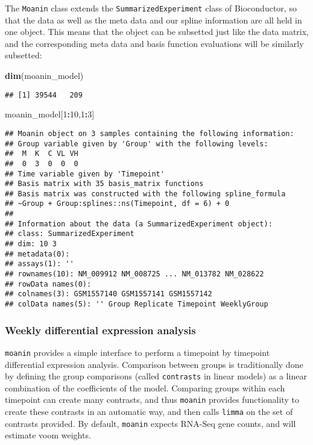 \documentclass[9pt,a4paper,]{extarticle}
\newenvironment{Shaded}{\begin{snugshade}}{\end{snugshade}}
\newcommand{\DecValTok}[1]{\textcolor[rgb]{0.00,0.00,0.81}{#1}}
\newcommand{\KeywordTok}[1]{\textcolor[rgb]{0.13,0.29,0.53}{\textbf{#1}}}
\newcommand{\NormalTok}[1]{#1}
\newcommand{\OperatorTok}[1]{\textcolor[rgb]{0.81,0.36,0.00}{\textbf{#1}}}
\begin{document}
The \texttt{Moanin} class extends the \texttt{SummarizedExperiment} class of Bioconductor, so that the data as well as the meta data and our spline information are all held in one object. This means that the object can be subsetted just like the data matrix, and the corresponding meta data and basis function evaluations will be similarly subsetted:

\begin{Shaded}
\begin{Highlighting}[]
\KeywordTok{dim}\NormalTok{(moanin_model)}
\end{Highlighting}
\end{Shaded}

\begin{verbatim}
## [1] 39544   209
\end{verbatim}

\begin{Shaded}
\begin{Highlighting}[]
\NormalTok{moanin_model[}\DecValTok{1}\OperatorTok{:}\DecValTok{10}\NormalTok{,}\DecValTok{1}\OperatorTok{:}\DecValTok{3}\NormalTok{]}
\end{Highlighting}
\end{Shaded}

\begin{verbatim}
## Moanin object on 3 samples containing the following information:
## Group variable given by 'Group' with the following levels:
##  M  K  C VL VH 
##  0  3  0  0  0 
## Time variable given by 'Timepoint'
## Basis matrix with 35 basis_matrix functions
## Basis matrix was constructed with the following spline_formula
## ~Group + Group:splines::ns(Timepoint, df = 6) + 0 
## 
## Information about the data (a SummarizedExperiment object):
## class: SummarizedExperiment 
## dim: 10 3 
## metadata(0):
## assays(1): ''
## rownames(10): NM_009912 NM_008725 ... NM_013782 NM_028622
## rowData names(0):
## colnames(3): GSM1557140 GSM1557141 GSM1557142
## colData names(5): '' Group Replicate Timepoint WeeklyGroup
\end{verbatim}

\hypertarget{weekly-differential-expression-analysis}{%
\subsubsection{Weekly differential expression analysis}\label{weekly-differential-expression-analysis}}

\texttt{moanin} provides a simple interface to perform a timepoint by timepoint
differential expression analysis. Comparison between groups is traditionally
done by defining the group comparisons (called \texttt{contrasts} in linear models)
as a linear combination of the coefficients of the model. Comparing groups
within each timepoint can create many contrasts, and thus \texttt{moanin} provides
functionality to create these contrasts in an automatic way, and then calls
\texttt{limma} \citep{ritchie:limma} on the set of contrasts provided. By default,
\texttt{moanin} expects RNA-Seq gene counts, and will estimate voom weights.
\end{document}
